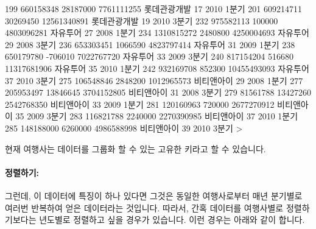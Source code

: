 \begin{Schunk}
\begin{Soutput}
199  660158348   28187000  7761111255 롯데관광개발   17 2010 1분기
201  609214711   30269450 12561340891 롯데관광개발   19 2010 3분기
232  975582113     100000  4803096281     자유투어   27 2008 1분기
234 1310815272    2480800  4250004693     자유투어   29 2008 3분기
236  653303451    1066590  4823797414     자유투어   31 2009 1분기
238  650179780    -706010  7022767720     자유투어   33 2009 3분기
240  817154204     516680 11317681906     자유투어   35 2010 1분기
242  932169708     852300 10455493093     자유투어   37 2010 3분기
275  106548846    2848200  1012965573   비티앤아이   29 2008 1분기
277  205953497   13846645  3704152805   비티앤아이   31 2008 3분기
279   81561788   13427260  2542768350   비티앤아이   33 2009 1분기
281  120160963     720000  2677270912   비티앤아이   35 2009 3분기
283  116821788    2240000  2270390985   비티앤아이   37 2010 1분기
285  148188000    6260000  4986588998   비티앤아이   39 2010 3분기
> 
\end{Soutput}
\end{Schunk}

현재 여행사는 데이터를 그룹화 할 수 있는 고유한 키라고 할 수 있습니다. 

\paragraph{정렬하기:}
그런데, 이 데이터에 특징이 하나 있다면 그것은 동일한 여행사로부터 매년 분기별로 여러번 반복하여 얻은 데이터라는 것입니다. 
따라서, 간혹 데이터를 여행사별로 정렬하기보다는 년도별로 정렬하고 싶을 경우가 있습니다.
이런 경우는 아래와 같이 합니다. 

